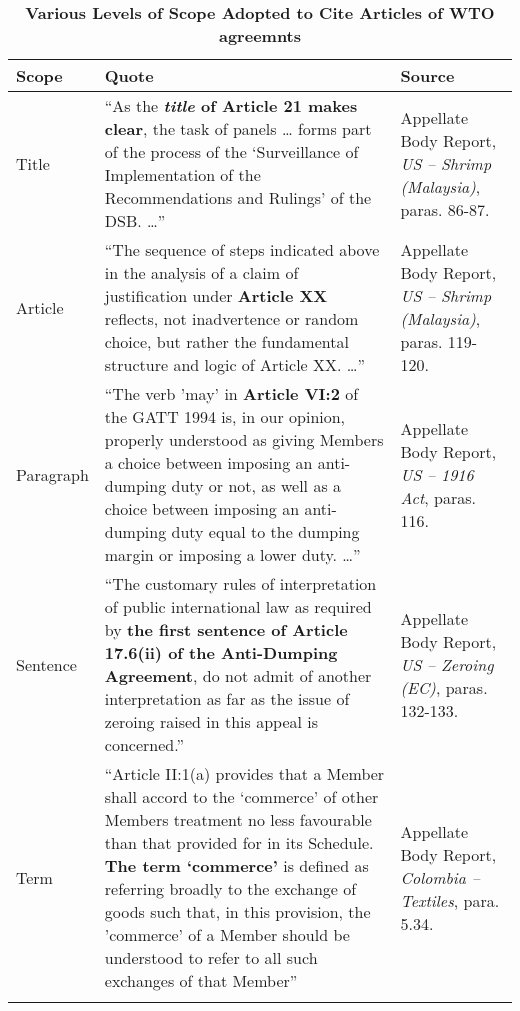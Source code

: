 \begin{xltabular}{\linewidth}{lXX}
    \caption{\textbf{Various Levels of Scope Adopted to Cite Articles of WTO agreemnts}}\\
    \hline
    \textbf{\normalsize Scope} 
    & \textbf{\normalsize Quote}
    & \textbf{\normalsize Source}
    \\
    \endfirsthead
    \hline \hline
    Title
    & ``As the \textbf{\textit{title}
    of Article 21 makes clear}, 
    the task of panels \ldots
    forms part of the process
    of the `Surveillance of 
    Implementation of the 
    Recommendations and Rulings' of the
    DSB. \ldots'' 
    & Appellate Body Report, \textit{US – Shrimp (Malaysia)}, paras. 86-87.
    \\
    \hline
    Article 
    &  ``The sequence of steps indicated above in the analysis of a claim of justification under \textbf{Article XX} reflects, not inadvertence or random choice, but rather the fundamental structure and logic of Article XX. \ldots''
    & Appellate Body Report, \textit{US – Shrimp (Malaysia)}, paras. 119-120.
    \\
    \hline
    Paragraph
    &  ``The verb 'may' in \textbf{Article VI:2} of the GATT 1994 is, in our opinion, properly
    understood as giving Members a choice between imposing an anti-dumping duty or
    not, as well as a choice between imposing an anti-dumping duty equal to the dumping
    margin or imposing a lower duty. \ldots''
    & Appellate Body Report, \textit{US – 1916 Act}, paras. 116.     
    \\
    \hline
    Sentence 
    & ``The customary rules of interpretation of public international law as
    required by \textbf{the first sentence of Article 17.6(ii) of the Anti-Dumping Agreement}, do
    not admit of another interpretation as far as the issue of zeroing raised in this appeal
    is concerned.''
    & Appellate Body Report, \textit{US – Zeroing (EC)}, paras. 132-133.
    \\
    \hline
    Term
    & ``Article II:1(a) provides that a
    Member shall accord to the `commerce' of other Members treatment no less
    favourable than that provided for in its Schedule. \textbf{The term `commerce'} is defined as
    referring broadly to the exchange of goods such that, in this provision, the 'commerce'
    of a Member should be understood to refer to all such exchanges of that Member''
    & Appellate Body Report, \textit{Colombia – Textiles}, para. 5.34.
    \\
    \hline
    \label{xltabular:level-of-scopes}
\end{xltabular}



